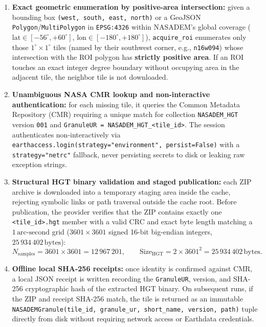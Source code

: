 \documentclass[11pt,a4paper]{article}
\newcommand{\unit}[1]{\mathrm{#1}}
\begin{document}
\begin{enumerate}
  \item \textbf{Exact geometric enumeration by positive-area intersection:} given a bounding box
        \texttt{(west, south, east, north)} or a GeoJSON \texttt{Polygon}/\texttt{MultiPolygon} in
        \texttt{EPSG:4326} within NASADEM's global coverage ($\text{lat} \in [-56^\circ, +60^\circ]$,
        $\text{lon} \in [-180^\circ, +180^\circ]$), \texttt{acquire\_roi} enumerates only those
        $1^\circ \times 1^\circ$ tiles (named by their southwest corner, e.g., \texttt{n16w094}) whose
        intersection with the ROI polygon has \textbf{strictly positive area}. If an ROI touches an exact integer
        degree boundary without occupying area in the adjacent tile, the neighbor tile is not downloaded.
  \item \textbf{Unambiguous NASA CMR lookup and non-interactive authentication:} for each missing tile, it queries
        the Common Metadata Repository (CMR) requiring a unique match for collection \texttt{NASADEM\_HGT} version
        \texttt{001} and \texttt{GranuleUR = NASADEM\_HGT\_<tile\_id>}. The session authenticates
        non-interactively via \texttt{earthaccess.login(strategy="environment", persist=False)} with a
        \texttt{strategy="netrc"} fallback, never persisting secrets to disk or leaking raw exception strings.
  \item \textbf{Structural HGT binary validation and staged publication:} each ZIP archive is downloaded into a
        temporary staging area inside the cache, rejecting symbolic links or path traversal outside the cache
        root. Before publication, the provider verifies that the ZIP contains exactly one \texttt{<tile\_id>.hgt}
        member with a valid CRC and exact byte length matching a $1\,\text{arc-second}$ grid ($3601 \times 3601$
        signed 16-bit big-endian integers, $25\,934\,402\,\text{bytes}$):
        \begin{equation}
          N_{\text{samples}} = 3601 \times 3601 = 12\,967\,201, \qquad
          \text{Size}_{\mathrm{HGT}} = 2 \times 3601^2 = 25\,934\,402\,\unit{bytes}.
          \label{eq:nasadem-hgt-size}
        \end{equation}
  \item \textbf{Offline local SHA-256 receipts:} once identity is confirmed against CMR, a local JSON receipt is
        written recording the \texttt{GranuleUR}, version, and SHA-256 cryptographic hash of the extracted HGT
        binary. On subsequent runs, if the ZIP and receipt SHA-256 match, the tile is returned as an immutable
        \texttt{NASADEMGranule(tile\_id, granule\_ur, short\_name, version, path)} tuple directly from disk
        without requiring network access or Earthdata credentials.
\end{enumerate}
\end{document}
